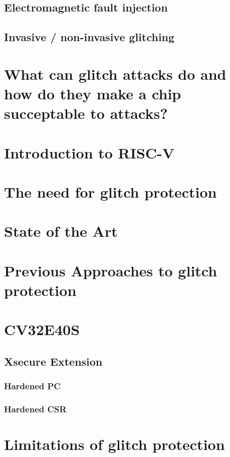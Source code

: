 \subsection{Electromagnetic fault injection}

\subsection{Invasive / non-invasive glitching}

\section{What can glitch attacks do and how do they make a chip succeptable to attacks?}

\section{Introduction to RISC-V}
\section{The need for glitch protection}
\section{State of the Art}
\section{Previous Approaches to glitch protection}
\section{CV32E40S}
\label{sec:cv32}
\subsection{Xsecure Extension}
\subsubsection{Hardened PC}
\subsubsection{Hardened CSR}
\section{Limitations of glitch protection}
\label{sec:limits}

